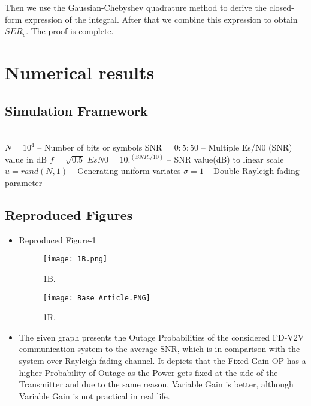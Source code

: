 \documentclass{article}
\begin{document}
\\\\Then we use the Gaussian-Chebyshev quadrature method to derive the closed-form expression of the integral. After that we combine this expression to obtain $SER_v$.
The proof is complete.



\section{Numerical results}
\subsection{Simulation Framework}
\justify
\\$N = 10^4$ -- Number of bits or symbols
\newline
SNR = $0:5:50$ -- Multiple Es/N0 (SNR) value in dB
\newline
$f = \sqrt{0.5}$
\newline
$EsN0 = 10.^(SNR./10)$ -- SNR value(dB) to linear scale
\newline
$u = rand(N, 1)$ -- Generating uniform variates
\newline
$\sigma = 1$ -- Double Rayleigh fading parameter
\newline


\subsection{Reproduced Figures}


\begin{itemize}
\item Reproduced Figure-1\\
\begin{figure}
  \begin{minipage}[b]{0.4\textwidth}
    \texttt{[image: 1B.png]}
    \caption{1B.}
  \end{minipage}
  \hfill
  \begin{minipage}[b]{0.4\textwidth}
    \texttt{[image: Base Article.PNG]}
    \caption{1R.}
  \end{minipage}
  \end{figure}
  \item The given graph presents the Outage Probabilities of the considered FD-V2V communication system to the average SNR, which is in comparison with the system over Rayleigh fading channel. It depicts that the Fixed Gain OP has a higher Probability of Outage as the Power gets fixed at the side of the Transmitter and due to the same reason, Variable Gain is better, although Variable Gain is not practical in real life.
\end{itemize}
\end{document}
